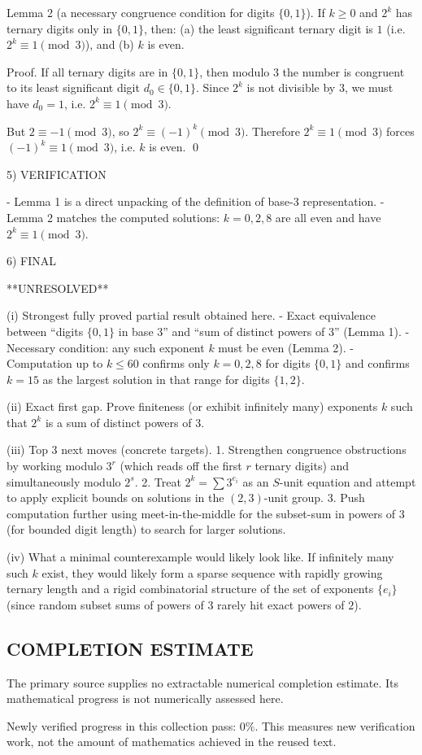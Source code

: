 Lemma 2 (a necessary congruence condition for digits $\{0,1\}$).
If $k\ge 0$ and $2^k$ has ternary digits only in $\{0,1\}$, then:
(a) the least significant ternary digit is $1$ (i.e. $2^k\equiv 1\pmod 3$), and
(b) $k$ is even.

Proof.
If all ternary digits are in $\{0,1\}$, then modulo $3$ the number is congruent to its least significant digit $d_0\in\{0,1\}$. Since $2^k$ is not divisible by $3$, we must have $d_0=1$, i.e. $2^k\equiv 1\pmod 3$.

But $2\equiv -1\pmod 3$, so $2^k\equiv (-1)^k\pmod 3$. Therefore $2^k\equiv 1\pmod 3$ forces $(-1)^k\equiv 1\pmod 3$, i.e. $k$ is even. \qed

5) VERIFICATION

- Lemma 1 is a direct unpacking of the definition of base-$3$ representation.
- Lemma 2 matches the computed solutions: $k=0,2,8$ are all even and have $2^k\equiv 1\pmod 3$.

6) FINAL

**UNRESOLVED**

(i) Strongest fully proved partial result obtained here.
- Exact equivalence between “digits $\{0,1\}$ in base $3$” and “sum of distinct powers of $3$” (Lemma 1).
- Necessary condition: any such exponent $k$ must be even (Lemma 2).
- Computation up to $k\le 60$ confirms only $k=0,2,8$ for digits $\{0,1\}$ and confirms $k=15$ as the largest solution in that range for digits $\{1,2\}$.

(ii) Exact first gap.
Prove finiteness (or exhibit infinitely many) exponents $k$ such that $2^k$ is a sum of distinct powers of $3$.

(iii) Top 3 next moves (concrete targets).
1. Strengthen congruence obstructions by working modulo $3^r$ (which reads off the first $r$ ternary digits) and simultaneously modulo $2^s$.
2. Treat $2^k=\sum 3^{e_i}$ as an $S$-unit equation and attempt to apply explicit bounds on solutions in the $(2,3)$-unit group.
3. Push computation further using meet-in-the-middle for the subset-sum in powers of $3$ (for bounded digit length) to search for larger solutions.

(iv) What a minimal counterexample would likely look like.
If infinitely many such $k$ exist, they would likely form a sparse sequence with rapidly growing ternary length and a rigid combinatorial structure of the set of exponents $\{e_i\}$ (since random subset sums of powers of $3$ rarely hit exact powers of $2$).




\subsection*{COMPLETION ESTIMATE}
The primary source supplies no extractable numerical completion estimate. Its mathematical progress is not numerically assessed here.

Newly verified progress in this collection pass: $0\%$. This measures new verification work, not the amount of mathematics achieved in the reused text.
